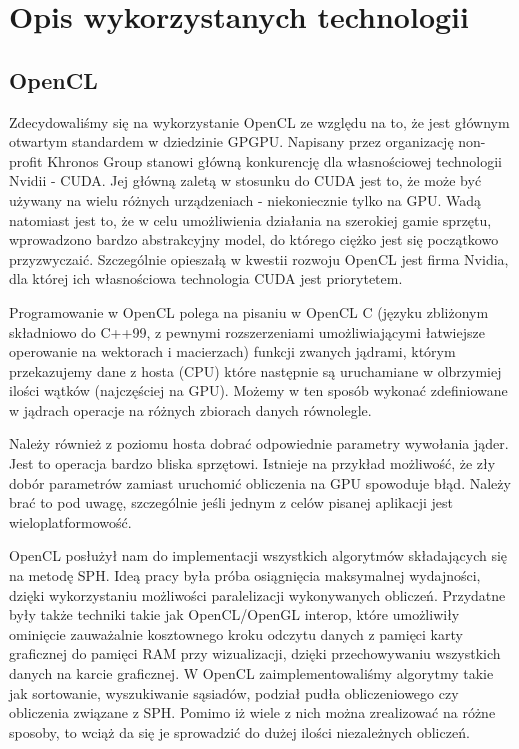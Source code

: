 \documentclass[polish, 12pt]{aghthesis}
\begin{document}
\section{Opis wykorzystanych technologii}

\subsection{OpenCL}
			Zdecydowaliśmy się na wykorzystanie OpenCL ze względu na to, że jest głównym otwartym standardem w dziedzinie GPGPU. Napisany przez organizację non-profit Khronos Group stanowi główną konkurencję dla własnościowej technologii Nvidii - CUDA. Jej główną zaletą w stosunku do CUDA jest to, że może być używany na wielu różnych urządzeniach - niekoniecznie tylko na GPU. Wadą natomiast jest to, że w celu umożliwienia działania na szerokiej gamie sprzętu, wprowadzono bardzo abstrakcyjny model, do którego ciężko jest się początkowo przyzwyczaić. Szczególnie opieszałą w kwestii rozwoju OpenCL jest firma Nvidia, dla której ich własnościowa technologia CUDA jest priorytetem.	

			Programowanie w OpenCL polega na pisaniu w OpenCL C (języku zbliżonym składniowo do C++99, z pewnymi rozszerzeniami umożliwiającymi łatwiejsze operowanie na wektorach i macierzach) funkcji zwanych jądrami, którym przekazujemy dane z hosta (CPU) które następnie są uruchamiane w olbrzymiej ilości wątków (najczęściej na GPU). Możemy w ten sposób wykonać zdefiniowane w jądrach operacje na różnych zbiorach danych równolegle. 
			
			Należy również z poziomu hosta dobrać odpowiednie parametry wywołania jąder. Jest to operacja bardzo bliska sprzętowi. Istnieje na przykład możliwość, że zły dobór parametrów zamiast uruchomić obliczenia na GPU spowoduje błąd. Należy brać to pod uwagę, szczególnie jeśli jednym z celów pisanej aplikacji jest wieloplatformowość.
			
			OpenCL posłużył nam do implementacji wszystkich algorytmów składających się na metodę SPH. Ideą pracy była próba osiągnięcia maksymalnej wydajności, dzięki wykorzystaniu możliwości paralelizacji wykonywanych obliczeń. Przydatne były także techniki takie jak OpenCL/OpenGL interop, które umożliwiły ominięcie zauważalnie kosztownego kroku odczytu danych z pamięci karty graficznej do pamięci RAM przy wizualizacji, dzięki przechowywaniu wszystkich danych na karcie graficznej. W OpenCL zaimplementowaliśmy algorytmy takie jak sortowanie, wyszukiwanie sąsiadów, podział pudła obliczeniowego czy obliczenia związane z SPH. Pomimo iż wiele z nich można zrealizować na różne sposoby, to wciąż da się je sprowadzić do dużej ilości niezależnych obliczeń.
			
\end{document}
